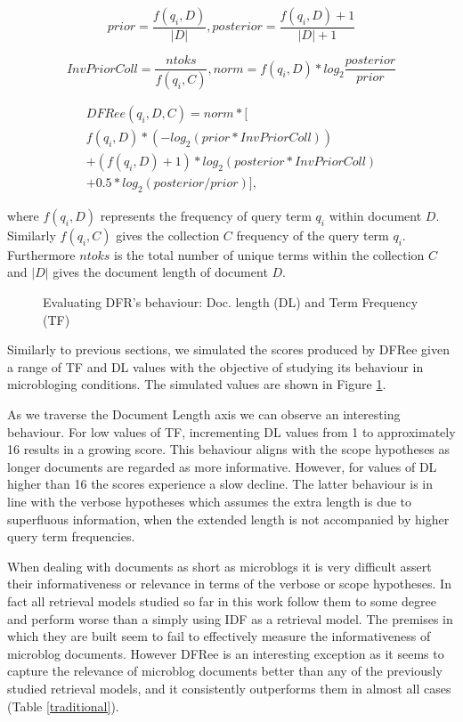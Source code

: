\begin{equation}
prior = \frac{f(q_i, D)}{|D|}, posterior = \frac{f(q_i, D)+1}{|D|+1} 
\end{equation}

\begin{equation}
InvPriorColl = \frac{ntoks}{f(q_i, C)}, norm = f(q_i, D)*log_2{\frac{posterior}{prior}}
\end{equation}

\begin{multline}
DFRee(q_i,D,C) = norm * [                    \\
f(q_i, D)*(-log_2(prior*InvPriorColl))       \\
+(f(q_i, D)+1)*log_2(posterior*InvPriorColl) \\
+ 0.5*log_2(posterior/prior)],
\end{multline}

where \(f(q_i, D)\) represents the frequency of query term \(q_i\) within document \(D\). Similarly \(f(q_i, C)\) gives the collection \(C\) frequency of the query term \(q_i\). Furthermore \(ntoks\) is the total number of unique terms within the collection \(C\) and \(|D|\) gives the document length of document \(D\).

\begin{figure}
	\centering
	\caption{Evaluating DFR's behaviour: Doc. length (DL) and Term Frequency (TF)}
	
	\label{dfrTFDLcomp}
\end{figure} 

Similarly to previous sections, we simulated the scores produced by DFRee given a range of TF and DL values with the objective of studying its behaviour in microbloging conditions. The simulated values are shown in Figure \ref{dfrTFDLcomp}.

As we traverse the Document Length axis we can observe an interesting behaviour. For low values of TF, incrementing DL values from 1 to approximately 16 results in a growing score. This behaviour aligns with the scope hypotheses as longer documents are regarded as more informative. However, for values of DL higher than 16 the scores experience a slow decline. The latter behaviour is in line with the verbose hypotheses which assumes the extra length is due to superfluous information, when the extended length is not accompanied by higher query term frequencies.

When dealing with documents as short as microblogs it is very difficult assert their informativeness or relevance in terms of the verbose or scope hypotheses. In fact all retrieval models studied so far in this work follow them to some degree and perform worse than a simply using IDF as a retrieval model. The premises in which they are built seem to fail to effectively measure the informativeness of microblog documents. However DFRee is an interesting exception as it seems to capture the relevance of microblog documents better than any of the previously studied retrieval models, and it consistently outperforms them in almost all cases (Table \ref{traditional}).

